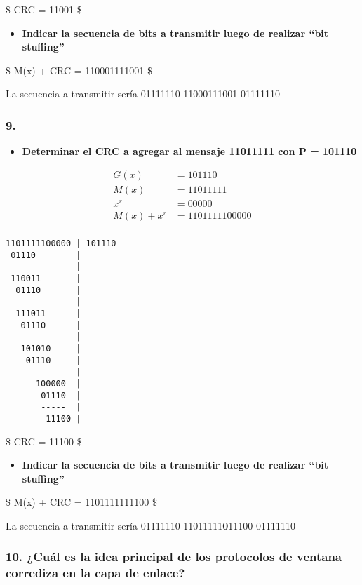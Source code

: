 \documentclass{article}
\begin{document}
\$ CRC = 11001 \$

\begin{itemize}
\itemsep1pt\parskip0pt
\item
  \textbf{Indicar la secuencia de bits a transmitir luego de realizar
  ``bit stuffing''}
\end{itemize}

\$ M(x) + CRC = 110001111001 \$

La secuencia a transmitir sería 01111110 11000111001 01111110

\subsubsection{9.}\label{section-1}

\begin{itemize}
\itemsep1pt\parskip0pt
\item
  \textbf{Determinar el CRC a agregar al mensaje 11011111 con P =
  101110}
\end{itemize}

\begin{align}
G(x)& =        101110 \\
M(x)& =        11011111 \\
x^r& =         00000 \\
M(x) + x^r& =  1101111100000 \\
\end{align}

\begin{verbatim}
1101111100000 | 101110
 01110        |
 -----        |
 110011       |
  01110       |
  -----       |
  111011      |
   01110      |
   -----      |
   101010     |
    01110     |
    -----     |
      100000  |
       01110  |
       -----  |
        11100 |
\end{verbatim}

\$ CRC = 11100 \$

\begin{itemize}
\itemsep1pt\parskip0pt
\item
  \textbf{Indicar la secuencia de bits a transmitir luego de realizar
  ``bit stuffing''}
\end{itemize}

\$ M(x) + CRC = 1101111111100 \$

La secuencia a transmitir sería 01111110 11011111\textbf{0}11100
01111110

\subsubsection{10. ¿Cuál es la idea principal de los protocolos de
ventana corrediza en la capa de
enlace?}\label{cuuxe1l-es-la-idea-principal-de-los-protocolos-de-ventana-corrediza-en-la-capa-de-enlace}
\end{document}

